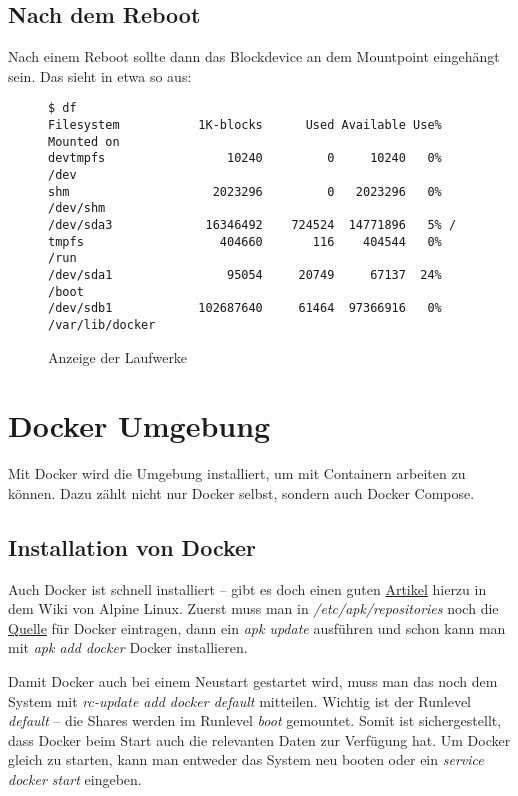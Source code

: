 \documentclass[12pt,a4paper]{article}
\newcommand{\code}[1]{\textit{#1}}
\begin{document}
\subsection{Nach dem Reboot}
Nach einem Reboot sollte dann das Blockdevice an dem Mountpoint eingehängt sein. Das sieht in etwa so aus:

\begin{figure}[H]
\begin{lstlisting}
$ df
Filesystem           1K-blocks      Used Available Use% Mounted on
devtmpfs                 10240         0     10240   0% /dev
shm                    2023296         0   2023296   0% /dev/shm
/dev/sda3             16346492    724524  14771896   5% /
tmpfs                   404660       116    404544   0% /run
/dev/sda1                95054     20749     67137  24% /boot
/dev/sdb1            102687640     61464  97366916   0% /var/lib/docker
\end{lstlisting}
\caption{Anzeige der Laufwerke}\label{fig:Anzeige der Laufwerke}
\end{figure}

\section{Docker Umgebung}
Mit Docker wird die Umgebung installiert, um mit Containern arbeiten zu können. Dazu zählt nicht nur Docker selbst,
sondern auch Docker Compose.

\subsection{Installation von Docker}
Auch Docker ist schnell installiert -- gibt es doch einen guten \href{https://wiki.alpinelinux.org/wiki/Docker}{Artikel}
hierzu in dem Wiki von Alpine Linux. Zuerst muss man in \code{/etc/apk/repositories} noch die
\href{http://dl-cdn.alpinelinux.org/alpine/latest-stable/community}{Quelle} für Docker eintragen, dann ein \code{apk update}
ausführen und schon kann man mit \code{apk add docker} Docker installieren.

Damit Docker auch bei einem Neustart gestartet wird, muss man das noch dem System mit \code{rc-update add docker default}
mitteilen. Wichtig ist der Runlevel \code{default} -- die Shares werden im Runlevel \code{boot} gemountet. Somit ist
sichergestellt, dass Docker beim Start auch die relevanten Daten zur Verfügung hat. Um Docker gleich zu starten, kann
man entweder das System neu booten oder ein \code{service docker start} eingeben.
\end{document}
